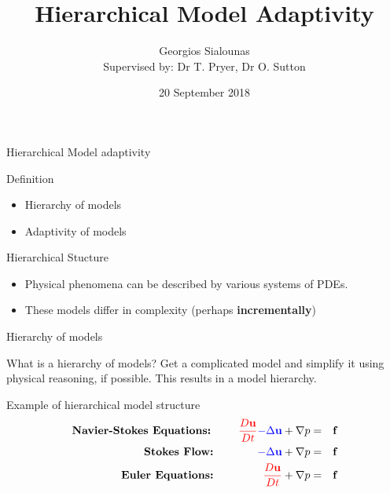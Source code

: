 \documentclass{beamer}
\title[Hierarchical Model Adaptivity]{Hierarchical Model Adaptivity}
\author[GS]{Georgios Sialounas \\{\small Supervised by: Dr T. Pryer,   Dr O. Sutton}}
\institute{MPE CDT}
\date{20 September 2018}
\theoremstyle{definition}
\begin{document}
\begin{frame}
  \titlepage
\end{frame}




\begin{frame}{Hierarchical Model adaptivity}
\centering
\begin{block}{Definition}
\begin{itemize}
\item Hierarchy of models
\item Adaptivity of models
\end{itemize}
\end{block}
\begin{block}{Hierarchical Stucture}
	\begin{itemize}
	\item  Physical phenomena can be described by various systems of PDEs. 
	\item These models differ in complexity (perhaps \textbf{incrementally})
	\end{itemize}
\end{block}
\end{frame}

\begin{frame}{Hierarchy of models}
\centering
\begin{block}{What is a hierarchy of models?}
Get a complicated model and simplify it using physical reasoning, if possible.  This results in a model hierarchy.
\end{block}
\begin{block}{Example of hierarchical model structure}
	\vspace{-4mm}
 \begin{eqnarray*}
		\textbf{Navier-Stokes Equations:}\quad\quad\,\,\,\textcolor{red}{\frac{D\textbf{u}}{Dt}}\textcolor{blue}{-\Delta \textbf{u}}+\nabla p&=&\textbf{f}\\
		\textbf{Stokes Flow:}\quad\quad\quad\quad \textcolor{blue}{-\Delta \textbf{u}}+\nabla p &=&\textbf{f}\\
	\textbf{Euler Equations: }\quad\quad\quad\quad\textcolor{red}{\frac{D\textbf{u}}{Dt}}+\nabla p&=&\textbf{f}
\end{eqnarray*}
\end{block}
\end{frame}
\end{document}

